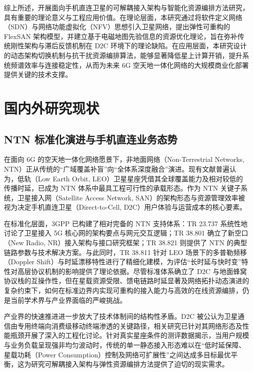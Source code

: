 \documentclass[type=master]{fduthesis}
\begin{document}
综上所述，开展面向手机直连卫星的可解耦接入架构与智能化资源编排方法研究，具有重要的理论意义与工程应用价值。在理论层面，本研究通过将软件定义网络（SDN）与网络功能虚拟化（NFV）思想引入卫星网络，提出弹性可重构的 FlexSAN 架构模型，并建立基于电磁地图先验信息的资源优化理论，旨在弥补传统刚性架构与滞后反馈机制在 D2C 环境下的理论缺陷。在应用层面，本研究设计的动态架构切换机制与抗干扰资源编排算法，能够显著降低星上计算开销，提升系统频谱效率与连接稳定性，从而为未来 6G 空天地一体化网络的大规模商业化部署提供关键的技术支撑\cite{liu2024democratizing, YS2024}。

\section{国内外研究现状}

\subsection{NTN 标准化演进与手机直连业务态势}
在面向 6G 的空天地一体化网络愿景下，非地面网络（Non-Terrestrial Networks, NTN）正从传统的“广域覆盖补盲”向“全体系深度融合”演进。现有文献普遍认为，低轨（Low Earth Orbit, LEO）卫星星座凭借其全球覆盖能力及相对较低的传播时延，已成为 NTN 体系中最具工程可行性的承载形态\cite{9217520,9970355}。作为 NTN 关键子系统，卫星接入网（Satellite Access Network, SAN）的架构形态与资源管理效率被视为决定手机直连卫星（Direct-to-Cell, D2C）用户体验与运营成本的核心要素\cite{10500741,9722775}。

在标准化层面，3GPP 已构建了相对完备的 NTN 支持体系：TR 23.737 系统性地讨论了卫星接入 5G 核心网的架构要点与网元交互逻辑；TR 38.801 确立了新空口（New Radio, NR）接入架构与接口研究框架；TR 38.821 则提供了 NTN 的典型链路参数与技术解决方案\cite{3gpp.23.737,3gpp.38.801,3gpp.38.821}。与此同时，TR 38.811 针对 LEO 场景下的多普勒频移（Doppler Shift）与时延漂移特性进行了精细化建模，为评估“长时延与快时变”特性对高层协议机制的影响提供了理论依据\cite{3gpp.38.811}。尽管标准体系确立了 D2C 与地面蜂窝协议栈的互操作性，但在星载资源受限、馈电链路时延显著及网络拓扑动态演进的复杂约束下，如何在标准边界内实现可重构的接入能力与高效的在线资源编排，仍是当前学术界与产业界面临的严峻挑战\cite{3gpp.38.821}。

产业界的快速推进进一步放大了技术体制间的结构性矛盾。D2C 被公认为卫星通信由专用终端向消费级移动终端渗透的关键路径，相关研究已针对其网络形态及性能瓶颈开展了深入的工程化讨论\cite{10.1145/3686138.3686140}。针对真实星座条件的测评数据揭示，当用户规模与业务负载呈现强非均匀波动时，传统的单一静态接入形态难以在“低时延保障、星载功耗（Power Consumption）控制及网络可扩展性”之间达成多目标最优平衡，这为研究可解耦接入架构与弹性资源编排方法提供了迫切的现实需求\cite{9970355,10500741,10978515}。
\end{document}
